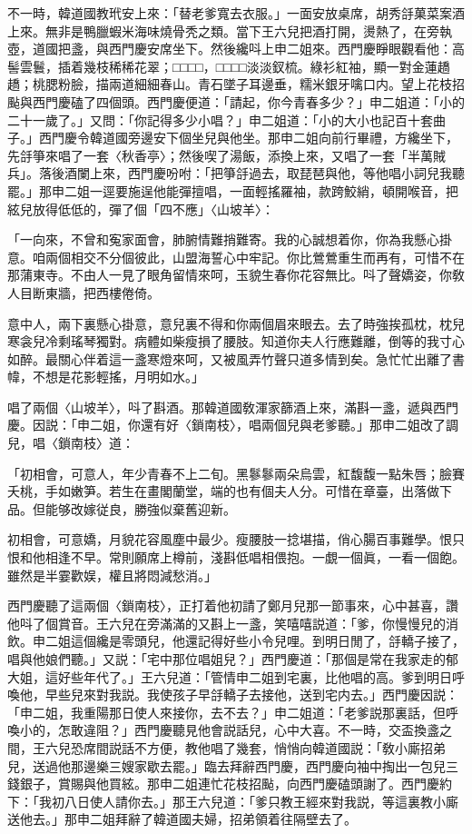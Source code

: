 不一時，韓道國教玳安上來：「替老爹寬去衣服。」一面安放桌席，胡秀㧱菓菜案酒上來。無非是鴨臘蝦米海味燒骨秃之類。當下王六兒把酒打開，燙熱了，在旁執壺，道國把盞，與西門慶安席坐下。然後纔呌上申二姐來。西門慶睜眼觀看他：高髻雲鬟，插着幾枝稀稀花翠；□□□□，□□□□淡淡釵梳。綠衫紅袖，顯一對金蓮趫趫；桃腮粉臉，描兩道細細春山。青石墜子耳邊垂，糯米銀牙噙口内。望上花枝招颭與西門慶磕了四個頭。西門慶便道：「請起，你今青春多少？」申二姐道：「小的二十一歲了。」又問：「你記得多少小唱？」申二姐道：「小的大小也記百十套曲子。」西門慶令韓道國旁邊安下個坐兒與他坐。那申二姐向前行畢禮，方纔坐下，先㧱箏來唱了一套〈秋香亭〉；然後喫了湯飯，添換上來，又唱了一套「半萬賊兵」。落後酒闌上來，西門慶吩咐：「把箏㧱過去，取琵琶與他，等他唱小詞兒我聽罷。」那申二姐一逕要施逞他能彈擅唱，一面輕搖羅袖，款跨鮫綃，頓開喉音，把絃兒放得低低的，彈了個「四不應」〈山坡羊〉：

「一向來，不曾和寃家面會，肺腑情難捎難寄。我的心誠想着你，你為我懸心掛意。咱兩個相交不分個彼此，山盟海誓心中牢記。你比鶯鶯重生而再有，可惜不在那蒲東寺。不由人一見了眼角留情來呵，玉貌生春你花容無比。呌了聲嬌姿，你敎人目断東牆，把西樓倦倚。

意中人，兩下裏懸心掛意，意兒裏不得和你兩個眉來眼去。去了時強挨孤枕，枕兒寒衾兒冷剩瑤琴獨對。病體如柴瘦損了腰肢。知道你夫人行應難離，倒等的我寸心如醉。最關心伴着這一盞寒燈來呵，又被風弄竹聲只道多情到矣。急忙忙出離了書幃，不想是花影輕搖，月明如水。」

唱了兩個〈山坡羊〉，呌了斟酒。那韓道國敎渾家篩酒上來，滿斟一盞，遞與西門慶。因説：「申二姐，你還有好〈鎖南枝〉，唱兩個兒與老爹聽。」那申二姐改了調兒，唱〈鎖南枝〉道：

「初相會，可意人，年少青春不上二旬。黑鬖鬖兩朵烏雲，紅馥馥一點朱唇；臉賽夭桃，手如嫩笋。若生在畫閣蘭堂，端的也有個夫人分。可惜在章臺，出落做下品。但能够改嫁従良，勝強似棄舊迎新。

初相會，可意嬌，月貌花容風塵中最少。瘦腰肢一捻堪描，俏心腸百事難學。恨只恨和他相逢不早。常則願席上樽前，淺斟低唱相偎抱。一覷一個眞，一看一個飽。雖然是半霎歡娱，權且將悶減愁消。」

西門慶聽了這兩個〈鎖南枝〉，正打着他初請了鄭月兒那一節事來，心中甚喜，讚他呌了個賞音。王六兒在旁滿滿的又斟上一盞，笑嘻嘻説道：「爹，你慢慢兒的消飲。申二姐這個纔是零頭兒，他還記得好些小令兒哩。到明日閒了，㧱轎子接了，唱與他娘們聽。」又説：「宅中那位唱姐兒？」西門慶道：「那個是常在我家走的郁大姐，這好些年代了。」王六兒道：「管情申二姐到宅裏，比他唱的高。爹到明日呼喚他，早些兒來對我説。我使孩子早㧱轎子去接他，送到宅内去。」西門慶因説：「申二姐，我重陽那日使人來接你，去不去？」申二姐道：「老爹説那裏話，但呼喚小的，怎敢違阻？」西門慶聽見他會説話兒，心中大喜。不一時，交盃換盞之間，王六兒恐席間説話不方便，教他唱了幾套，悄悄向韓道國説：「敎小廝招弟兒，送過他那邊樂三嫂家歇去罷。」臨去拜辭西門慶，西門慶向袖中掏出一包兒三錢銀子，賞賜與他買絃。那申二姐連忙花枝招颭，向西門慶磕頭謝了。西門慶約下：「我初八日使人請你去。」那王六兒道：「爹只教王經來對我説，等這裏教小廝送他去。」那申二姐拜辭了韓道國夫婦，招弟領着往隔壁去了。

